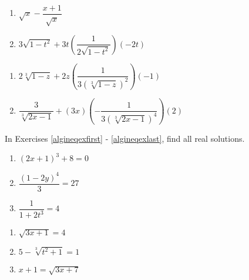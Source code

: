 \documentclass{ximera}
\begin{document}
\begin{multicols}{2}
\begin{enumerate}
\setcounter{enumi}{\value{HW}}

\item  $\sqrt{x} - \dfrac{x+1}{\sqrt{x}}$

\item  $3 \sqrt{1-t^2} + 3t\left(\dfrac{1}{2 \sqrt{1-t^2}}\right)(-2t)$

\setcounter{HW}{\value{enumi}}
\end{enumerate}
\end{multicols}

\begin{multicols}{2}
\begin{enumerate}
\setcounter{enumi}{\value{HW}}

\item  $2 \sqrt[3]{1-z} + 2z \left(\dfrac{1}{3 \left(\sqrt[3]{1-z}\right)^2}\right)(-1)$


\item  $\dfrac{3}{\sqrt[3]{2x-1}} + (3x)\left(-\dfrac{1}{3 \left(\sqrt[3]{2x-1} \right)^4}\right)(2)$  \label{simpradlast}

\setcounter{HW}{\value{enumi}}
\end{enumerate}
\end{multicols}



In Exercises \ref{algineqexfirst} - \ref{algineqexlast}, find all real solutions.

\begin{multicols}{3}
\begin{enumerate}
\setcounter{enumi}{\value{HW}}

\item  $(2x+1)^3 + 8 = 0$ \label{algineqexfirst} 
\item $\dfrac{(1-2y)^{4}}{3} = 27$ 
\item  $\dfrac{1}{1 + 2t^3} = 4$ 


\setcounter{HW}{\value{enumi}}
\end{enumerate}
\end{multicols}

\begin{multicols}{3}
\begin{enumerate}
\setcounter{enumi}{\value{HW}}

\item $\sqrt{3x+1} = 4$
\item $5 - \sqrt[3]{t^2+1} = 1$
\item $x+1 = \sqrt{3x+7}$ %

\setcounter{HW}{\value{enumi}}
\end{enumerate}
\end{multicols}
\end{document}
